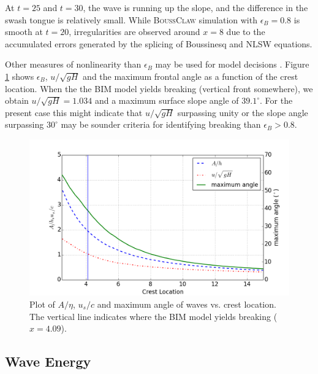 \documentclass[review]{elsarticle}
\newcommand{\BoussClaw}{\textsc{BoussClaw} }
\begin{document}
At $t=25$ and $t=30$, the wave is running up the slope, 
and the difference in the swash tongue is relatively small. 
While \BoussClaw simulation with $\epsilon_B=0.8$ is
smooth at $t=20$, irregularities are observed
around $x=8$ due to the accumulated errors generated by the splicing of 
Boussinesq and NLSW equations.%

Other measures of nonlinearity than $\epsilon_B$ may be used for model decisions 
\citep{lynett2006nearshore,matsuyama2007study}. Figure \ref{fig:wave_break_criteria} shows 
$\epsilon_B$, $u/\sqrt{gH}$ and the maximum frontal angle 
as a function of the crest location.
When the the BIM model yields breaking (vertical front somewhere), 
we obtain $u/\sqrt{gH} = 1.034$ and a maximum surface slope angle of $39.1^\circ$.
For the present case this might indicate that $u/\sqrt{gH}$ surpassing unity or 
the slope angle surpassing  
$30^\circ$ may be sounder criteria for identifying breaking than $\epsilon_B>0.8$.
 
\begin{figure}[tbh!]
\centering
\includegraphics[width=.7\textwidth]{_fig/wave_break}
\caption{Plot of $A/\eta$, $u_s/c$ and maximum angle of waves vs. crest location. 
The vertical line indicates where the BIM model yields breaking ($x=4.09$). }
\label{fig:wave_break_criteria}
\end{figure}

\subsection{Wave Energy}
\end{document}
